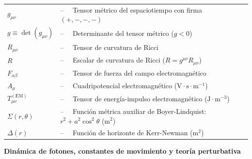 \begin{tabular}{ll}
$g_{\mu\nu}$ & --$\quad$ Tensor métrico del espaciotiempo con firma $(+,-,-,-)$\\
$g \equiv \det(g_{\mu\nu})$ & --$\quad$ Determinante del tensor métrico ($g < 0$)\\
$R_{\mu\nu}$ & --$\quad$ Tensor de curvatura de Ricci\\
$R$ & --$\quad$ Escalar de curvatura de Ricci ($R = g^{\mu\nu} R_{\mu\nu}$)\\
$F_{\alpha\beta}$ & --$\quad$ Tensor de fuerza del campo electromagnético\\
$A_\mu$ & --$\quad$ Cuadripotencial electromagnético ($\text{V}\cdot\text{s}\cdot\text{m}^{-1}$)\\
$T_{\mu\nu}^{(\mathrm{EM})}$ & --$\quad$ Tensor de energía-impulso electromagnético ($\text{J}\cdot\text{m}^{-3}$)\\
$\Sigma(r,\theta)$ & --$\quad$ Función métrica auxiliar de Boyer-Lindquist: $r^2 + a^2 \cos^2\theta$ ($\text{m}^2$)\\
$\Delta(r)$ & --$\quad$ Función de horizonte de Kerr-Newman ($\text{m}^2$)\\
\end{tabular}
\newpage
\vspace{0.5cm}
\noindent\textbf{Dinámica de fotones, constantes de movimiento y teoría perturbativa}
\vspace{0.2cm}

